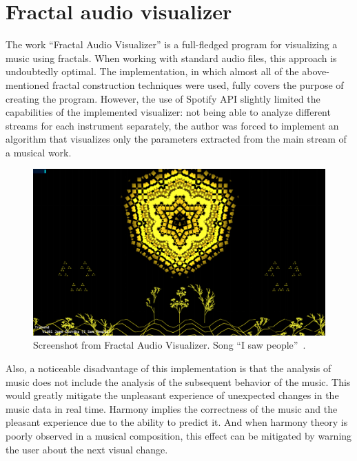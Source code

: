 \documentclass[thesis=B,english]{FITthesis}[2019/12/23]
\begin{document}
\section{Fractal audio visualizer}

The work “Fractal Audio Visualizer” \cite{fractal_visualizer} is a full-fledged program for visualizing a music using fractals. When working with standard audio files, this approach is undoubtedly optimal. The implementation, in which almost all of the above-mentioned fractal construction techniques were used, fully covers the purpose of creating the program. However, the use of Spotify API slightly limited the capabilities of the implemented visualizer: not being able to analyze different streams for each instrument separately, the author was forced to implement an algorithm that visualizes only the parameters extracted from the main stream of a musical work. 

\begin{figure}[ht]
            \includegraphics[width=\textwidth]{FAV_02.png}
            \caption[Fractal Audio Visualizer]{Screenshot from Fractal Audio Visualizer. Song “I saw people”~\cite{fractal_visualizer}.}
            \label{fig:ScreenshotFAV}
\end{figure}

Also, a noticeable disadvantage of this implementation is that the analysis of music does not include the analysis of the subsequent behavior of the music. This would greatly mitigate the unpleasant experience of unexpected changes in the music data in real time. Harmony implies the correctness of the music and the pleasant experience due to the ability to predict it. And when harmony theory is poorly observed in a musical composition, this effect can be mitigated by warning the user about the next visual change.
\end{document}
